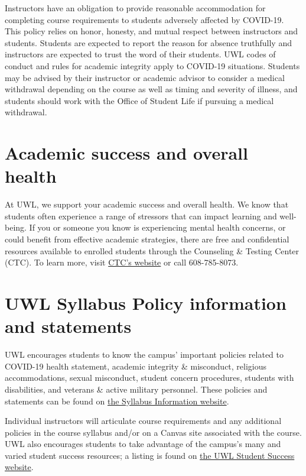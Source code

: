 \documentclass[
    letterpaper,paper=portrait,fleqn,
    DIV=16,fontsize=11pt,twoside=semi,
    parskip=full-,
    headings=standardclasses]
{scrartcl}
\begin{document}
Instructors have an obligation to provide reasonable accommodation for completing course requirements to students adversely affected by COVID-19. This policy relies on honor, honesty, and mutual respect between instructors and students. Students are expected to report the reason for absence truthfully and instructors are expected to trust the word of their students. UWL codes of conduct and rules for academic integrity apply to COVID-19 situations. Students may be advised by their instructor or academic advisor to consider a medical withdrawal depending on the course as well as timing and severity of illness, and students should work with the Office of Student Life if pursuing a medical withdrawal.

\section*{Academic success and overall health}

At UWL, we support your academic success and overall health. We know that students often experience a range of stressors that can impact learning and well-being. If you or someone you know is experiencing mental health concerns, or could benefit from effective academic strategies, there are free and confidential resources available to enrolled students through the Counseling \& Testing Center (CTC). To learn more, visit  \href{https://www.uwlax.edu/counseling-testing/}{CTC's website} or call 608-785-8073.

\section*{UWL Syllabus Policy information and statements}

UWL encourages students to know the campus' important policies related to COVID-19 health statement, academic integrity \& misconduct, religious accommodations, sexual misconduct, student concern procedures, students with disabilities, and veterans \& active military personnel. These policies and statements can be found on  \href{https://www.uwlax.edu/info/syllabus/}{the Syllabus Information website}.

Individual instructors will articulate course requirements and any additional policies in the course syllabus and/or on a Canvas site associated with the course. UWL also encourages students to take advantage of the campus's many and varied student success resources; a listing is found on \href{https://www.uwlax.edu/info/student-success}{the UWL Student Success website}.
\end{document}

